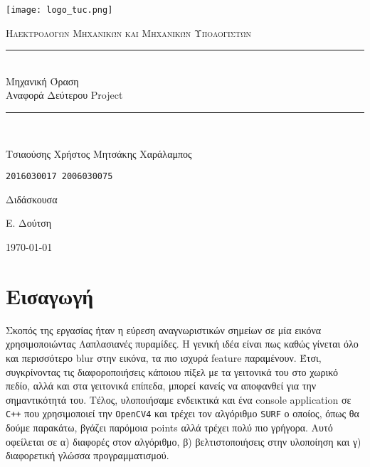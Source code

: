 \documentclass[11pt]{scrartcl} %
\begin{document}
\begin{titlepage}
    \centering
    \texttt{[image: logo\_tuc.png]}\par\vspace{1cm}
    \normalfont\normalsize
    \textsc{\textcolor[rgb]{0.66, 0.09, 0.19}{Ηλεκτρολόγων Μηχανικών και Μηχανικών Υπολογιστών}}\\ %
    \vspace{25pt} %
    \rule{\linewidth}{0.5pt}\\ %
    \vspace{20pt} %
    {\Huge Μηχανική Όραση}\\ %

    {\huge Αναφορά Δεύτερου Project}\\ %
    \vspace{12pt} %
    \rule{\linewidth}{2pt}\\ %
    \vspace{12pt} %
    \vspace{2cm}

    {\LARGE{Τσιαούσης Χρήστος \hfill Μητσάκης Χαράλαμπος}
        \par
        \texttt{2016030017 \hfill 2006030075}
        \par
    }

    \vfill
    Διδάσκουσα

    Ε. Δούτση

    \vfill

    {\large \today\par}
\end{titlepage}

\newpage



\section{Εισαγωγή}
Σκοπός της εργασίας ήταν η εύρεση αναγνωριστικών σημείων σε μία εικόνα χρησιμοποιώντας Λαπλασιανές πυραμίδες.
Η γενική ιδέα είναι πως καθώς γίνεται όλο και περισσότερο blur στην εικόνα, τα πιο ισχυρά feature παραμένουν.
Έτσι, συγκρίνοντας τις διαφοροποιήσεις κάποιου πίξελ με τα γειτονικά του στο χωρικό πεδίο, αλλά και στα γειτονικά
επίπεδα, μπορεί κανείς να αποφανθεί για την σημαντικότητά του. Τέλος, υλοποιήσαμε ενδεικτικά και ένα console
application σε \texttt{C++} που χρησιμοποιεί την \texttt{OpenCV4} και τρέχει τον αλγόριθμο \texttt{SURF} ο οποίος,
όπως θα δούμε παρακάτω, βγάζει παρόμοια points αλλά τρέχει πολύ πιο γρήγορα. Αυτό οφείλεται σε α) διαφορές στον αλγόριθμο,
β) βελτιστοποιήσεις στην υλοποίηση και γ) διαφορετική γλώσσα προγραμματισμού.
\end{document}
